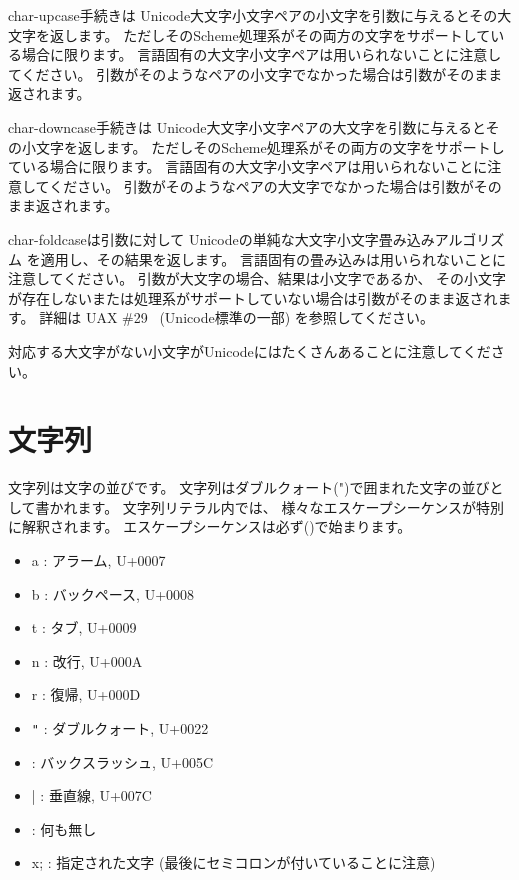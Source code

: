 \begin{entry}{%
}


{\cf char-upcase}手続きは
Unicode大文字小文字ペアの小文字を引数に与えるとその大文字を返します。
ただしそのScheme処理系がその両方の文字をサポートしている場合に限ります。
言語固有の大文字小文字ペアは用いられないことに注意してください。
引数がそのようなペアの小文字でなかった場合は引数がそのまま返されます。

{\cf char-downcase}手続きは
Unicode大文字小文字ペアの大文字を引数に与えるとその小文字を返します。
ただしそのScheme処理系がその両方の文字をサポートしている場合に限ります。
言語固有の大文字小文字ペアは用いられないことに注意してください。
引数がそのようなペアの大文字でなかった場合は引数がそのまま返されます。

{\cf char-foldcase}は引数に対して
Unicodeの単純な大文字小文字畳み込みアルゴリズム
を適用し、その結果を返します。
言語固有の畳み込みは用いられないことに注意してください。
引数が大文字の場合、結果は小文字であるか、
その小文字が存在しないまたは処理系がサポートしていない場合は引数がそのまま返されます。
詳細は UAX \#29~\cite{uax29} (Unicode標準の一部) を参照してください。

対応する大文字がない小文字がUnicodeにはたくさんあることに注意してください。

\end{entry}


\section{文字列}
\label{stringsection}

文字列は文字の並びです。
\vest 文字列はダブルクォート({\cf "})で囲まれた文字の並びとして書かれます。
文字列リテラル内では、
様々なエスケープシーケンスが特別に解釈されます。
エスケープシーケンスは必ず(\backwhack{})で始まります。

\begin{itemize}
\item{\cf\backwhack{}a} : アラーム, U+0007
\item{\cf\backwhack{}b} : バックペース, U+0008 
\item{\cf\backwhack{}t} : タブ, U+0009 
\item{\cf\backwhack{}n} : 改行, U+000A 
\item{\cf\backwhack{}r} : 復帰, U+000D 
\item{\cf\backwhack{}}\verb|"| : ダブルクォート, U+0022 
\item{\cf\backwhack{}\backwhack{}} : バックスラッシュ, U+005C 
\item{\cf\backwhack{}|} : 垂直線, U+007C
\item{\cf\backwhack{}
      } : 何も無し
\item{\cf\backwhack{}x;} : 指定された文字
(最後にセミコロンが付いていることに注意)
\end{itemize}

